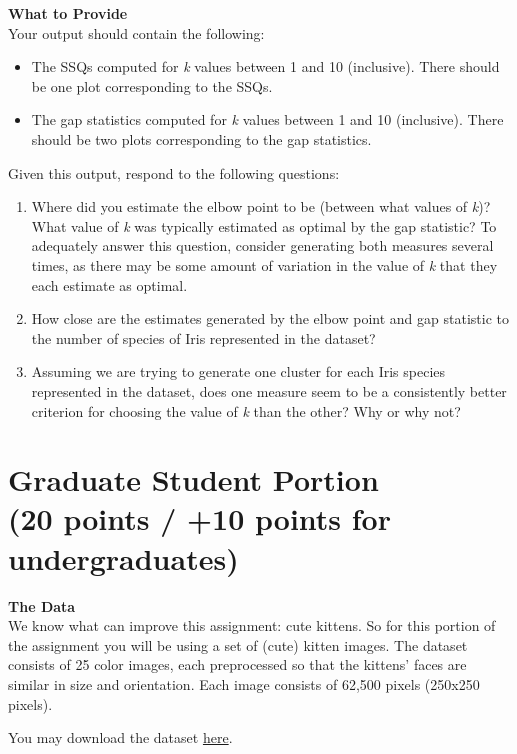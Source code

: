 \documentclass[paper=a4, fontsize=11pt]{scrartcl} %
\numberwithin{equation}{section} %
\numberwithin{figure}{section} %
\numberwithin{table}{section} %
\begin{document}
\textbf{What to Provide}\\
Your output should contain the following:
\begin{itemize}
\item The SSQs computed for \textit{k} values between 1 and 10 (inclusive). There should be one plot corresponding to the SSQs.
\item The gap statistics computed for \textit{k} values between 1 and 10 (inclusive). There should be two plots corresponding to the gap statistics.
\end{itemize}
Given this output, respond to the following questions:
\begin{enumerate}
\item Where did you estimate the elbow point to be (between what values of \textit{k})? What value of \textit{k} was typically estimated as optimal by the gap statistic? To adequately answer this question, consider generating both measures several times, as there may be some amount of variation in the value of \textit{k} that they each estimate as optimal.
\item How close are the estimates generated by the elbow point and gap statistic to the number of species of Iris represented in the dataset?
\item Assuming we are trying to generate one cluster for each Iris species represented in the dataset, does one measure seem to be a consistently better criterion for choosing the value of \textit{k} than the other? Why or why not?
\end{enumerate}


\newpage
\section{Graduate Student Portion\\(20 points / +10 points for undergraduates)}

\textbf{The Data}\\
We know what can improve this assignment:  cute kittens. So for this portion of the assignment you will be using a set of (cute) kitten images. The dataset consists of 25 color images, each preprocessed so that the kittens' faces are similar in size and orientation. Each image consists of 62,500 pixels (250x250 pixels).

\vspace{6pt}

You may download the dataset \href{https://github.com/cse40647/cse40647/blob/sp.14/assignment2/campus.zip}{here}.
\end{document}
